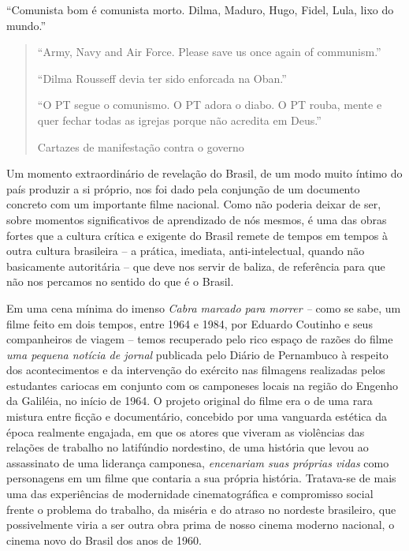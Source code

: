 ``Comunista bom é comunista morto. Dilma, Maduro, Hugo, Fidel, Lula,
lixo do mundo.''

\begin{quote}
``Army, Navy and Air Force. Please save us once again of communism.''

``Dilma Rousseff devia ter sido enforcada na Oban.''

``O PT segue o comunismo. O PT adora o diabo. O PT rouba, mente e quer
fechar todas as igrejas porque não acredita em Deus.''

Cartazes de manifestação contra o governo
\end{quote}

Um momento extraordinário de revelação do Brasil, de um modo muito
íntimo do país produzir a si próprio, nos foi dado pela conjunção de um
documento concreto com um importante filme nacional. Como não poderia
deixar de ser, sobre momentos significativos de aprendizado de nós
mesmos, é uma das obras fortes que a cultura crítica e exigente do
Brasil remete de tempos em tempos à outra cultura brasileira -- a
prática, imediata, anti-intelectual, quando não basicamente autoritária
-- que deve nos servir de baliza, de referência para que não nos
percamos no sentido do que é o Brasil.

Em uma cena mínima do imenso \emph{Cabra marcado para morrer --} como se
sabe, um filme feito em dois tempos, entre 1964 e 1984, por Eduardo
Coutinho e seus companheiros de viagem -- temos recuperado pelo rico
espaço de razões do filme \emph{uma pequena notícia de jornal} publicada
pelo Diário de Pernambuco à respeito dos acontecimentos e da intervenção
do exército nas filmagens realizadas pelos estudantes cariocas em
conjunto com os camponeses locais na região do Engenho da Galiléia, no
início de 1964. O projeto original do filme era o de uma rara mistura
entre ficção e documentário, concebido por uma vanguarda estética da
época realmente engajada, em que os atores que viveram as violências das
relações de trabalho no latifúndio nordestino, de uma história que levou
ao assassinato de uma liderança camponesa, \emph{encenariam suas
próprias vidas} como personagens em um filme que contaria a sua própria
história. Tratava-se de mais uma das experiências de modernidade
cinematográfica e compromisso social frente o problema do trabalho, da
miséria e do atraso no nordeste brasileiro, que possivelmente viria a
ser outra obra prima de nosso cinema moderno nacional, o cinema novo do
Brasil dos anos de 1960.

